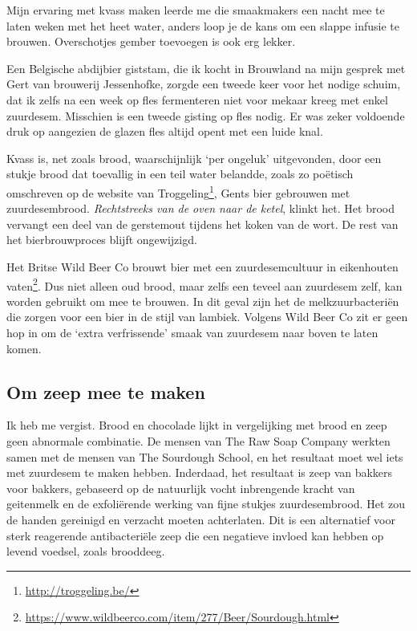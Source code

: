 \documentclass[
  11pt,
  dutch,
]{memoir}
\begin{document}
Mijn ervaring met kvass maken leerde me die smaakmakers een nacht mee te
laten weken met het heet water, anders loop je de kans om een slappe
infusie te brouwen. Overschotjes gember toevoegen is ook erg lekker.

Een Belgische abdijbier giststam, die ik kocht in Brouwland na mijn
gesprek met Gert van brouwerij Jessenhofke, zorgde een tweede keer voor
het nodige schuim, dat ik zelfs na een week op fles fermenteren niet
voor mekaar kreeg met enkel zuurdesem. Misschien is een tweede gisting
op fles nodig. Er was zeker voldoende druk op aangezien de glazen fles
altijd opent met een luide knal.

Kvass is, net zoals brood, waarschijnlijk `per ongeluk' uitgevonden,
door een stukje brood dat toevallig in een teil water belandde, zoals zo
poëtisch omschreven op de website van Troggeling\footnote{\url{http://troggeling.be/}},
Gents bier gebrouwen met zuurdesembrood. \emph{Rechtstreeks van de oven
naar de ketel}, klinkt het. Het brood vervangt een deel van de
gerstemout tijdens het koken van de wort. De rest van het
bierbrouwproces blijft ongewijzigd.

Het Britse Wild Beer Co brouwt bier met een zuurdesemcultuur in
eikenhouten vaten\footnote{\url{https://www.wildbeerco.com/item/277/Beer/Sourdough.html}}.
Dus niet alleen oud brood, maar zelfs een teveel aan zuurdesem zelf, kan
worden gebruikt om mee te brouwen. In dit geval zijn het de
melkzuurbacteriën die zorgen voor een bier in de stijl van lambiek.
Volgens Wild Beer Co zit er geen hop in om de `extra verfrissende' smaak
van zuurdesem naar boven te laten komen.

\hypertarget{om-zeep-mee-te-maken}{%
\subsection{Om zeep mee te maken}\label{om-zeep-mee-te-maken}}

Ik heb me vergist. Brood en chocolade lijkt in vergelijking met brood en
zeep geen abnormale combinatie. De mensen van The Raw Soap Company
werkten samen met de mensen van The Sourdough School, en het resultaat
moet wel iets met zuurdesem te maken hebben. Inderdaad, het resultaat is
zeep van bakkers voor bakkers, gebaseerd op de natuurlijk vocht
inbrengende kracht van geitenmelk en de exfoliërende werking van fijne
stukjes zuurdesembrood. Het zou de handen gereinigd en verzacht moeten
achterlaten. Dit is een alternatief voor sterk reagerende antibacteriële
zeep die een negatieve invloed kan hebben op levend voedsel, zoals
brooddeeg.
\end{document}
